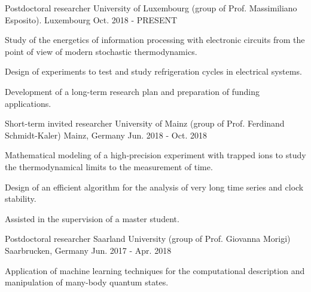 

\begin{cventries}

  \cventry
    {Postdoctoral researcher} %
    {University of Luxembourg (group of Prof. Massimiliano Esposito).} %
    {Luxembourg} %
    {Oct. 2018 - PRESENT} %
    {
      \begin{cvitems} %
        \item {Study of the energetics of information processing with electronic circuits from the
        point of view of modern stochastic thermodynamics.}
        \item {Design of experiments to test and study refrigeration cycles in electrical systems.}
        \item {Development of a long-term research plan and preparation of funding applications.}
      \end{cvitems}
    }

  \cventry
    {Short-term invited researcher} %
    {University of Mainz (group of Prof. Ferdinand Schmidt-Kaler) } %
    {Mainz, Germany} %
    {Jun. 2018 - Oct. 2018} %
    {
      \begin{cvitems} %
        \item Mathematical modeling of a high-precision experiment with trapped ions to study the thermodynamical
        limits to the measurement of time.
        \item Design of an efficient algorithm for the analysis of very long time series and clock stability.
        \item Assisted in the supervision of a master student.
      \end{cvitems}
    }

  \cventry
    {Postdoctoral researcher} %
    {Saarland University (group of Prof. Giovanna Morigi) } %
    {Saarbrucken, Germany} %
    {Jun. 2017 - Apr. 2018} %
    {
      \begin{cvitems} %
        \item Application of machine learning techniques for the computational
        description and manipulation of many-body quantum states.
      \end{cvitems}
    }


\end{cventries}
